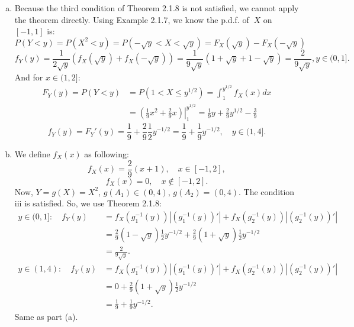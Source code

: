 \documentclass[14pt]{elegantbook}
\begin{document}
    \begin{solution}
        \begin{enumerate}[(a)]
            \item Because the third condition of Theorem 2.1.8 is not satisfied, we cannot apply the theorem directly. 
            Using Example 2.1.7, we know the p.d.f. of $\ X$ on $[-1,1]$ is: 
            \[P(Y<y)=P(X^2<y)=P(-\sqrt{y}<X<\sqrt{y})=F_X(\sqrt{y})-F_X(-\sqrt{y})\]
            \[f_Y(y)=\frac{1}{2\sqrt{y}}(f_X(\sqrt{y})+f_X(-\sqrt{y}))=\frac{1}{9\sqrt{y}}(1+\sqrt{y}+1-\sqrt{y})=\frac{2}{9\sqrt{y}},y\in (0, 1]. \]
            And for $x\in (1,2]$: 
            \begin{align*}
                F_Y(y)=P(Y<y)&=P(1<X\leq y^{1/2})=\int_{1}^{y^{1/2}}f_X(x)dx\\
                &=\left.\left(\frac{1}{9}x^2+\frac{2}{9}x\right)\right|_1^{y^{1/2}}=\frac{1}{9}y+\frac{2}{9}y^{1/2}-\frac{3}{9}
            \end{align*}
            \[f_Y(y)=F_Y'(y)=\frac{1}{9}+\frac{2}{9}\frac{1}{2}y^{-1/2}=\frac{1}{9}+\frac{1}{9}y^{-1/2}, \quad y\in(1,4]. \]
            \item 
            We define $f_X(x)$ as following: 
            \[
                f_X(x)=\frac{2}{9}(x+1), \quad x\in [-1, 2], 
            \]
            \[
                f_X(x)=0, \quad x\notin [-1, 2].
            \]
            Now, $Y=g(X)=X^2$, $g(A_1)\in(0,4)$, $g(A_2)=(0,4)$. The condition iii is satisfied. So, we use Theorem 2.1.8: 
            \begin{align*}
                y\in(0,1]: \quad f_Y(y)&=f_X(g_1^{-1}(y))\left|\left(g_1^{-1}(y)\right)'\right|+f_X(g_2^{-1}(y))\left|\left(g_2^{-1}(y)\right)'\right|\\
                &=\frac{2}{9}(1-\sqrt{y})\frac{1}{2}y^{-1/2}+\frac{2}{9}(1+\sqrt{y})\frac{1}{2}y^{-1/2}\\
                &=\frac{2}{9\sqrt{y}}.\\
                y\in(1,4): \quad f_Y(y)&=f_X(g_1^{-1}(y))\left|\left(g_1^{-1}(y)\right)'\right|+f_X(g_2^{-1}(y))\left|\left(g_2^{-1}(y)\right)'\right|\\
                &=0+\frac{2}{9}(1+\sqrt{y})\frac{1}{2}y^{-1/2}\\
                &=\frac{1}{9}+\frac{1}{9}y^{-1/2}.
            \end{align*}
            Same as part (a). 
        \end{enumerate}
    \end{solution}
\end{document}
